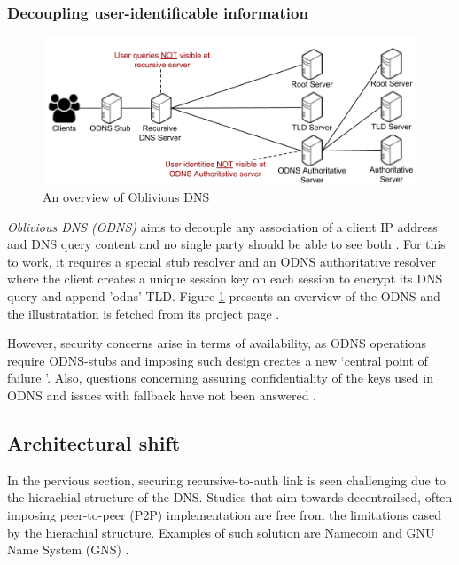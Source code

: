 \subsubsection{Decoupling user-identificable information}
\begin{figure}[h!]
    \begin{center}
    \includegraphics*[width=0.9\columnwidth]{img/ODNSoverview}
    \end{center}
    \caption{An overview of Oblivious DNS \cite{ODNSwebsite}}
    \label{odnsoverview}
\end{figure}
\textit{Oblivious DNS (ODNS)} aims to decouple any association of a client IP address and DNS query content and no single party should be able to see both \cite{annee-dprive-oblivious-dns-00}.
For this to work, it requires a special stub resolver and an ODNS authoritative resolver where the client creates a unique session key on each session to encrypt its DNS query and append 'odns' TLD.
Figure \ref{odnsoverview} presents an overview of the ODNS and the illustratation is fetched from its project page \cite{ODNSwebsite}.

However, security concerns arise in terms of availability, as ODNS operations require ODNS-stubs and imposing such design creates a new `central point of failure \cite{minutes-102-dprive}'.
Also, questions concerning assuring confidentiality of the keys used in ODNS and issues with fallback have not been answered \cite{minutes-102-dprive}. 

\subsection{Architectural shift}
In the pervious section, securing recursive-to-auth link is seen challenging due to the hierachial structure of the DNS.
Studies that aim towards decentrailsed, often imposing peer-to-peer (P2P) implementation are free from the limitations cased by the hierachial structure.
Examples of such solution are Namecoin \cite{loibl2014namecoin} and GNU Name System (GNS) \cite{grothoff2017nsa, wachs2014censorship}.

